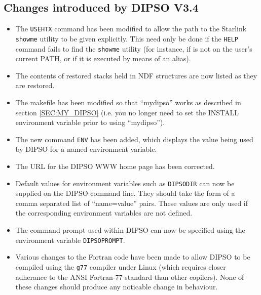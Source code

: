 \documentclass[twoside,11pt]{article}
\renewcommand{\_}{\texttt{\symbol{95}}}
\begin{document}
\subsection{Changes introduced by DIPSO V3.4}
\begin{itemize}

\item The {\tt USEHTX} command has been modified to allow the path to the
Starlink {\tt showme} utility to be given explicitly. This need only be done 
if the {\tt HELP} command fails to find the {\tt showme} utility (for
instance, if is not on the user's current PATH, or if it is
executed by means of an alias). 

\item The contents of restored stacks held in NDF structures are now
listed as they are restored.

\item The makefile has been modified so that ``my\_dipso'' works as
described in section \ref{SEC:MY_DIPSO} (i.e. you no longer need to
set the INSTALL environment variable prior to using ``my\_dipso'').

\item The new command {\tt ENV} has been added, which displays the value
being used by DIPSO for a named environment variable.

\item The URL for the DIPSO WWW home page has been corrected.

\item Default values for environment variables such as \verb+DIPSODIR+ can
now be supplied on the DIPSO command line. They should take the form of a
comma separated list of ``name=value'' pairs. These values are only used
if the corresponding environment variables are not defined.

\item The command prompt used within DIPSO can now be specified using the 
environment variable \verb+DIPSOPROMPT+.

\item Various changes to the Fortran code have been made to allow DIPSO
to be compiled using the \verb+g77+ compiler under Linux (which requires
closer adherance to the ANSI Fortran-77 standard than other copilers).
None of these changes should produce any noticable change in behaviour.

\end{itemize}
\end{document}
